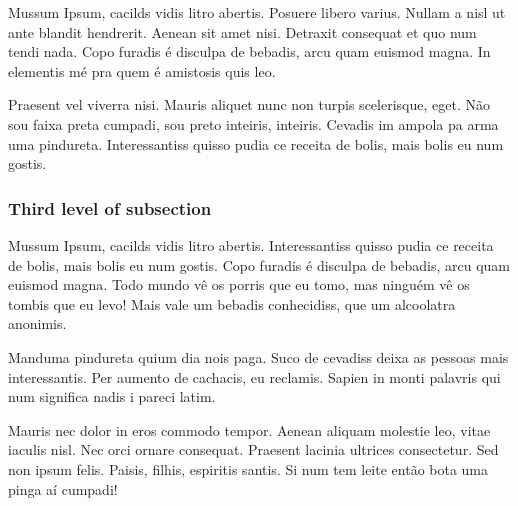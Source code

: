 \documentclass{article}
\begin{document}
Mussum Ipsum, cacilds vidis litro abertis. Posuere libero varius. Nullam a nisl ut ante blandit hendrerit. Aenean sit amet nisi. Detraxit consequat et quo num tendi nada. Copo furadis é disculpa de bebadis, arcu quam euismod magna. In elementis mé pra quem é amistosis quis leo.

Praesent vel viverra nisi. Mauris aliquet nunc non turpis scelerisque, eget. Não sou faixa preta cumpadi, sou preto inteiris, inteiris. Cevadis im ampola pa arma uma pindureta. Interessantiss quisso pudia ce receita de bolis, mais bolis eu num gostis.

\subsubsection{Third level of subsection}

Mussum Ipsum, cacilds vidis litro abertis. Interessantiss quisso pudia ce receita de bolis, mais bolis eu num gostis. Copo furadis é disculpa de bebadis, arcu quam euismod magna. Todo mundo vê os porris que eu tomo, mas ninguém vê os tombis que eu levo! Mais vale um bebadis conhecidiss, que um alcoolatra anonimis.

Manduma pindureta quium dia nois paga. Suco de cevadiss deixa as pessoas mais interessantis. Per aumento de cachacis, eu reclamis. Sapien in monti palavris qui num significa nadis i pareci latim.

Mauris nec dolor in eros commodo tempor. Aenean aliquam molestie leo, vitae iaculis nisl. Nec orci ornare consequat. Praesent lacinia ultrices consectetur. Sed non ipsum felis. Paisis, filhis, espiritis santis. Si num tem leite então bota uma pinga aí cumpadi!
\end{document}
